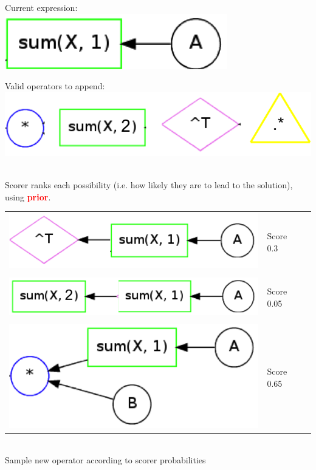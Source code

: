 \documentclass[landscape,a0b]{a0poster_csml_v2}
\begin{document}
\begin{poster}
\begin{PosterColumn}
\begin{minipage}[hc]{0.45\textwidth}
  \centering
  Current expression: \\
  \includegraphics[width=0.5\linewidth]{imgs/current.png}
\end{minipage}
\hfill
\begin{minipage}[hc]{0.45\textwidth}
  \centering
  Valid operators to append:\\
  \includegraphics[width=0.8\linewidth]{imgs/possible.png}
\end{minipage}
\vspace{1.5cm}
\\
\textcolor{mpigreen}{Scorer} ranks each possibility (i.e. how likely they are to lead to the solution), using {\bf \textcolor{red}{prior}}.
\vspace{0.5cm}
\\
\begin{minipage}[hc]{\textwidth}
  \begin{center}
    \begin{tabular}{lll}
      \includegraphics[width=0.2\linewidth]{imgs/prior1.png} \hspace{4cm} & Score 0.3 \\
                                                                          & & \\
      \includegraphics[width=0.2\linewidth]{imgs/prior2.png}  & Score 0.05 \\
                                                                          & & \\
      \includegraphics[width=0.2\linewidth]{imgs/prior3.png}  & Score 0.65 \\
    \end{tabular}
  \end{center}
\end{minipage}
\vspace{0.5cm}
\\
Sample new operator according to scorer probabilities


\end{PosterColumn}
\end{poster}
\end{document}
